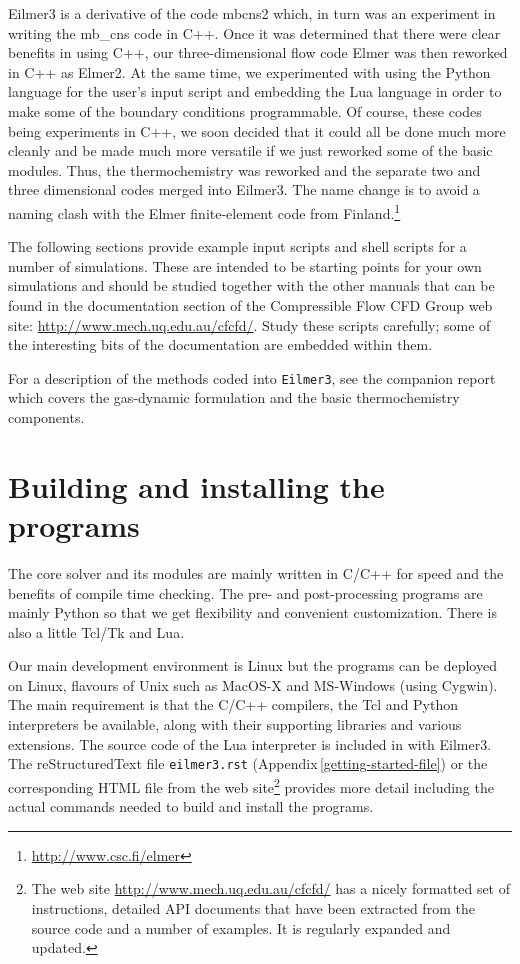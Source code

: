 \documentclass[12pt,a4paper,twoside]{article}
\begin{document}
\medskip
Eilmer3 is a derivative of the code mbcns2 which, in turn was an experiment in writing
the mb\_cns code in C++.
Once it was determined that there were clear benefits in using C++,
our three-dimensional flow code Elmer was then reworked in C++ as Elmer2.
At the same time, we experimented with using the Python language for the user's input script and 
embedding the Lua language in order to make some of the boundary conditions programmable.
Of course, these codes being experiments in C++, we soon decided that it could all be done
much more cleanly and be made much more versatile if we just reworked some of the basic modules.
Thus, the thermochemistry was reworked and the separate two and three dimensional codes merged
into Eilmer3.
The name change is to avoid a naming clash with the Elmer finite-element code 
from Finland.\footnote{\url{http://www.csc.fi/elmer}}

\medskip 
The following sections provide example input scripts and shell scripts for a number of simulations.
These are intended to be starting points for your own simulations and should be studied together with 
the other manuals that can be found in the documentation section of the 
Compressible Flow CFD Group web site:  
\url{http://www.mech.uq.edu.au/cfcfd/}.
Study these scripts carefully; some of the interesting bits of the documentation are
embedded within them.

\medskip
For a description of the methods coded into \texttt{Eilmer3}, see the companion report \cite{jacobs_etal_2010b}
which covers the gas-dynamic formulation and the basic thermochemistry components.

\clearpage
\section{Building and installing the programs}
%
The core solver and its modules are mainly written in C/C++ for speed and the benefits of compile time checking. 
The pre- and post-processing programs are mainly Python so that we get flexibility and convenient customization.
There is also a little Tcl/Tk and Lua.

\medskip
Our main development environment is Linux but the programs can be deployed on
Linux, flavours of Unix such as MacOS-X and MS-Windows (using Cygwin).
The main requirement is that the C/C++ compilers, the Tcl and Python
interpreters be available, along with their supporting libraries and 
various extensions. 
The source code of the Lua interpreter is included in with Eilmer3.
The reStructuredText file \texttt{eilmer3.rst} (Appendix\,\ref{getting-started-file}) 
or the corresponding HTML file from the web site\footnote{The web site 
\url{http://www.mech.uq.edu.au/cfcfd/} has a nicely formatted set of instructions,
detailed API documents that have been extracted from the source code and 
a number of examples.  It is regularly expanded and updated.}
provides more detail including 
the actual commands needed to build and install the programs.
\end{document}
